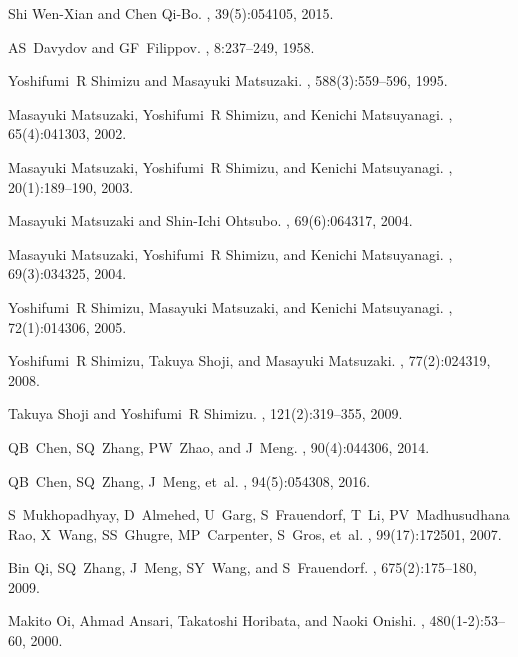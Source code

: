 \documentclass[myclassdoc,debug]{rjparticle}
\begin{document}
\begin{thebibliography}{99}
Shi Wen-Xian and Chen Qi-Bo.
, 39(5):054105, 2015.

AS~Davydov and GF~Filippov.
, 8:237--249, 1958.

Yoshifumi~R Shimizu and Masayuki Matsuzaki.
, 588(3):559--596, 1995.

Masayuki Matsuzaki, Yoshifumi~R Shimizu, and Kenichi Matsuyanagi.
, 65(4):041303, 2002.

Masayuki Matsuzaki, Yoshifumi~R Shimizu, and Kenichi Matsuyanagi.
,
  20(1):189--190, 2003.

Masayuki Matsuzaki and Shin-Ichi Ohtsubo.
, 69(6):064317, 2004.

Masayuki Matsuzaki, Yoshifumi~R Shimizu, and Kenichi Matsuyanagi.
, 69(3):034325, 2004.

Yoshifumi~R Shimizu, Masayuki Matsuzaki, and Kenichi Matsuyanagi.
, 72(1):014306, 2005.

Yoshifumi~R Shimizu, Takuya Shoji, and Masayuki Matsuzaki.
, 77(2):024319, 2008.

Takuya Shoji and Yoshifumi~R Shimizu.
, 121(2):319--355, 2009.

QB~Chen, SQ~Zhang, PW~Zhao, and J~Meng.
, 90(4):044306, 2014.

QB~Chen, SQ~Zhang, J~Meng, et~al.
, 94(5):054308, 2016.

S~Mukhopadhyay, D~Almehed, U~Garg, S~Frauendorf, T~Li, PV~Madhusudhana Rao,
  X~Wang, SS~Ghugre, MP~Carpenter, S~Gros, et~al.
, 99(17):172501, 2007.

Bin Qi, SQ~Zhang, J~Meng, SY~Wang, and S~Frauendorf.
, 675(2):175--180, 2009.

Makito Oi, Ahmad Ansari, Takatoshi Horibata, and Naoki Onishi.
, 480(1-2):53--60, 2000.


\end{thebibliography}
\end{document}
